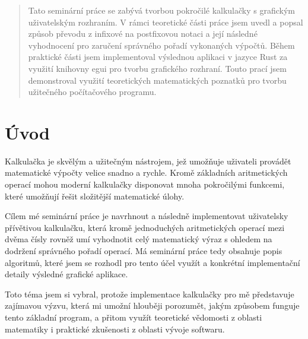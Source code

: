 \documentclass[12pt]{report}
\begin{document}

\renewcommand{\abstractname}{Anotace}
\begin{abstract}
Tato seminární práce se zabývá tvorbou pokročilé kalkulačky s grafickým uživatelským rozhraním. V rámci teoretické části práce jsem uvedl a popsal způsob převodu z infixové na postfixovou notaci a její následné vyhodnocení pro zaručení správného pořadí vykonaných výpočtů. Během praktické části jsem implementoval výslednou aplikaci v jazyce Rust za využití knihovny egui pro tvorbu grafického rozhraní. Touto prací jsem demonstroval využití teoretických matematických poznatků pro tvorbu užitečného počítačového programu.
\end{abstract}





\toc

\chapter{Úvod}

Kalkulačka je skvělým a užitečným nástrojem, jež umožňuje uživateli
provádět matematické výpočty velice snadno a rychle. Kromě základních
aritmetických operací mohou moderní kalkulačky disponovat mnoha
pokročilými funkcemi, které umožňují řešit složitější matematické úlohy.

Cílem mé seminární práce je navrhnout a následně implementovat
uživatelsky přívětivou kalkulačku, která kromě jednoduchých
aritmetických operací mezi dvěma čísly rovněž umí vyhodnotit celý
matematický výraz s ohledem na dodržení správného pořadí operací. Má
seminární práce tedy obsahuje popis algoritmů, které jsem se rozhodl pro
tento účel využít a konkrétní implementační detaily výsledné grafické
aplikace.

Toto téma jsem si vybral, protože implementace kalkulačky pro mě
představuje zajímavou výzvu, která mi umožní hlouběji porozumět, jakým
způsobem funguje tento základní program, a přitom využít teoretické
vědomosti z oblasti matematiky i praktické zkušenosti z oblasti vývoje
softwaru.
\end{document}
